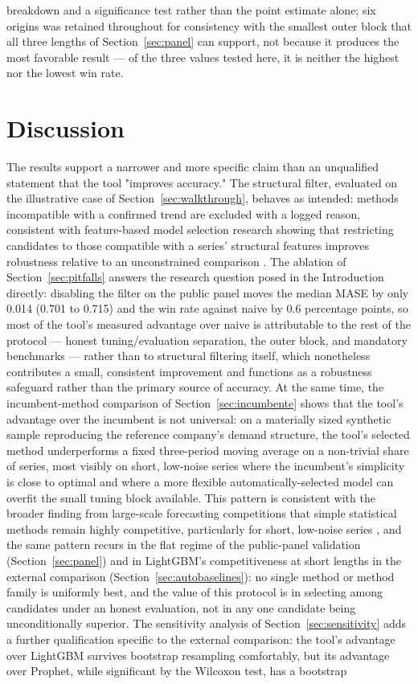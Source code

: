 \documentclass[forecasting,article,submit,pdftex,moreauthors]{Definitions/mdpi}
\begin{document}
breakdown and a significance test rather than the point estimate alone; six origins was retained throughout for consistency with the smallest outer block that all three lengths of Section~\ref{sec:panel} can support, not because it produces the most favorable result --- of the three values tested here, it is neither the highest nor the lowest win rate.

\section{Discussion}
\label{sec:discussion}

The results support a narrower and more specific claim than an unqualified statement that the tool "improves accuracy." The structural filter, evaluated on the illustrative case of Section~\ref{sec:walkthrough}, behaves as intended: methods incompatible with a confirmed trend are excluded with a logged reason, consistent with feature-based model selection research showing that restricting candidates to those compatible with a series' structural features improves robustness relative to an unconstrained comparison \cite{monteromanso2020,talagala2021}. The ablation of Section~\ref{sec:pitfalls} answers the research question posed in the Introduction directly: disabling the filter on the public panel moves the median MASE by only 0.014 (0.701 to 0.715) and the win rate against naive by 0.6 percentage points, so most of the tool's measured advantage over naive is attributable to the rest of the protocol --- honest tuning/evaluation separation, the outer block, and mandatory benchmarks --- rather than to structural filtering itself, which nonetheless contributes a small, consistent improvement and functions as a robustness safeguard rather than the primary source of accuracy. At the same time, the incumbent-method comparison of Section~\ref{sec:incumbente} shows that the tool's advantage over the incumbent is not universal: on a materially sized synthetic sample reproducing the reference company's demand structure, the tool's selected method underperforms a fixed three-period moving average on a non-trivial share of series, most visibly on short, low-noise series where the incumbent's simplicity is close to optimal and where a more flexible automatically-selected model can overfit the small tuning block available. This pattern is consistent with the broader finding from large-scale forecasting competitions that simple statistical methods remain highly competitive, particularly for short, low-noise series \cite{makridakis2020}, and the same pattern recurs in the flat regime of the public-panel validation (Section~\ref{sec:panel}) and in LightGBM's competitiveness at short lengths in the external comparison (Section~\ref{sec:autobaselines}): no single method or method family is uniformly best, and the value of this protocol is in selecting among candidates under an honest evaluation, not in any one candidate being unconditionally superior. The sensitivity analysis of Section~\ref{sec:sensitivity} adds a further qualification specific to the external comparison: the tool's advantage over LightGBM survives bootstrap resampling comfortably, but its advantage over Prophet, while significant by the Wilcoxon test, has a bootstrap 
\end{document}
